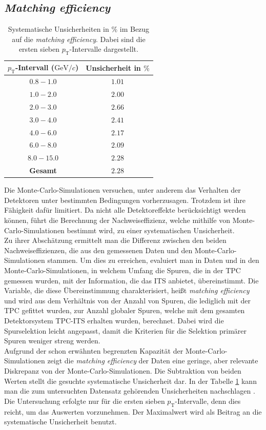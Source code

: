 \documentclass[12pt,a4paper]{report}
\begin{document}
\subsection{\textit{Matching efficiency}}
\vspace{-1em}
\begin{table}[H]
\centering
\begin{tabular}{|c c|}
\hline
\textbf{$p_{\mathrm{T}}$-Intervall ($\mathrm{GeV}/c$)} & \textbf{Unsicherheit in $\%$}\\
\hline
\hline
\rowcolor{mygray} $0.8 - 1.0$ & $1.01$\\
		  $1.0 - 2.0$ & $2.00$\\
\rowcolor{mygray} $2.0 - 3.0$ & $2.66$\\
		  $3.0 - 4.0$ & $2.41$\\
\rowcolor{mygray} $4.0 - 6.0$ & $2.17$\\
		  $6.0 - 8.0$ & $2.09$\\
\rowcolor{mygray} $8.0 - 15.0$ & $2.28$\\
\hline
\hline
			 \textbf{Gesamt} & $2.28$\\
\hline
\end{tabular}
\caption{Systematische Unsicherheiten in $\%$ im Bezug auf die \textit{matching efficiency}. Dabei sind die ersten sieben $p_{\mathrm{T}}$-Intervalle dargestellt.}
\label{tab:MatchingEff}
\end{table}
Die Monte-Carlo-Simulationen versuchen, unter anderem das Verhalten der Detektoren unter bestimmten Bedingungen vorherzusagen. Trotzdem ist ihre Fähigkeit dafür limitiert. Da nicht alle Detektoreffekte berücksichtigt werden können, führt die Berechnung der Nachweiseffizienz, welche mithilfe von Monte-Carlo-Simulationen bestimmt wird, zu einer systematischen Unsicherheit.\\
Zu ihrer Abschätzung ermittelt man die Differenz zwischen den beiden Nachweis\-effizienzen, die aus den gemessenen Daten und den Monte-Carlo-Simulationen stammen. Um dies zu erreichen, evaluiert man in Daten und in den Monte-Carlo-Simulationen, in welchem Umfang die Spuren, die in der TPC gemessen wurden, mit der Information, die das ITS anbietet, übereinstimmt. Die Variable, die diese Übereinstimmung charakterisiert, heißt \textit{matching efficiency} und wird aus dem Verhältnis von der Anzahl von Spuren, die lediglich mit der TPC gefittet wurden, zur Anzahl globaler Spuren, welche mit dem gesamten Detektorsystem TPC-ITS erhalten wurden, berechnet. Dabei wird die Spurselektion leicht angepasst, damit die Kriterien für die Selektion primärer Spuren weniger streng werden.\\
Aufgrund der schon erwähnten begrenzten Kapazität der Monte-Carlo-Simulationen zeigt die \textit{matching efficiency} der Daten eine geringe, aber relevante Diskrepanz von der Monte-Carlo-Simulationen. Die Subtraktion von beiden Werten stellt die gesuchte systematische Unsicherheit dar. In der Tabelle \ref{tab:MatchingEff} kann man die zum untersuchten Datensatz gehörenden Unsicherheiten nachschlagen \cite{DataPG}. Die Untersuchung erfolgte nur für die ersten sieben $p_{\mathrm{T}}$-Intervalle, denn dies reicht, um das Auswerten vorzunehmen. Der Maximalwert wird als Beitrag an die systematische Unsicherheit benutzt.
\end{document}
